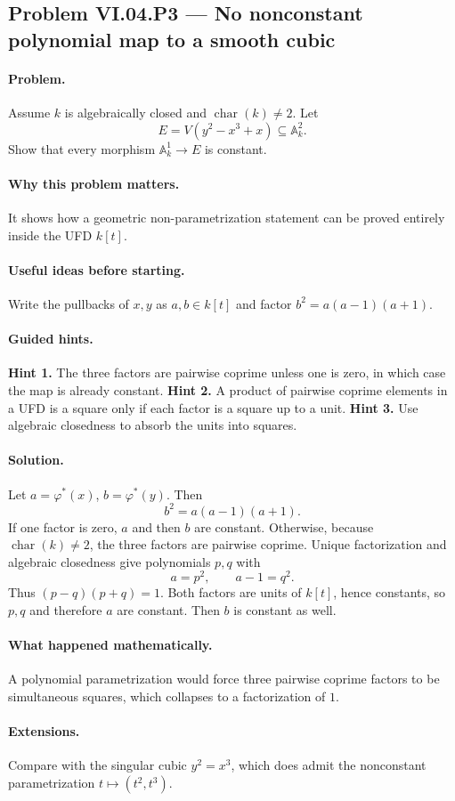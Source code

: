 \subsection*{Problem VI.04.P3 --- No nonconstant polynomial map to a smooth cubic}
\label{prob:vi04-p3}
\paragraph{Problem.}
Assume \(k\) is algebraically closed and \(\operatorname{char}(k)\neq2\).  Let
\[
E=V(y^2-x^3+x)\subseteq\mathbb A_k^2.
\]
Show that every morphism \(\mathbb A_k^1\to E\) is constant.
\ifdefined\FullProblemDossiers
\paragraph{Why this problem matters.}  It shows how a geometric non-parametrization
statement can be proved entirely inside the UFD \(k[t]\).
\paragraph{Useful ideas before starting.}  Write the pullbacks of \(x,y\) as \(a,b\in k[t]\)
and factor \(b^2=a(a-1)(a+1)\).
\paragraph{Guided hints.}  \textbf{Hint 1.} The three factors are pairwise coprime unless
one is zero, in which case the map is already constant.  \textbf{Hint 2.} A product of
pairwise coprime elements in a UFD is a square only if each factor is a square up to a unit.
\textbf{Hint 3.} Use algebraic closedness to absorb the units into squares.
\paragraph{Solution.}
Let \(a=\varphi^*(x)\), \(b=\varphi^*(y)\).  Then
\[
b^2=a(a-1)(a+1).
\]
If one factor is zero, \(a\) and then \(b\) are constant.  Otherwise, because
\(\operatorname{char}(k)\neq2\), the three factors are pairwise coprime.  Unique
factorization and algebraic closedness give polynomials \(p,q\) with
\[
a=p^2,\qquad a-1=q^2.
\]
Thus \((p-q)(p+q)=1\).  Both factors are units of \(k[t]\), hence constants, so \(p,q\)
and therefore \(a\) are constant.  Then \(b\) is constant as well.
\paragraph{What happened mathematically.}  A polynomial parametrization would force three
pairwise coprime factors to be simultaneous squares, which collapses to a factorization of
\(1\).
\paragraph{Extensions.}  Compare with the singular cubic \(y^2=x^3\), which does admit the
nonconstant parametrization \(t\mapsto(t^2,t^3)\).
\fi
